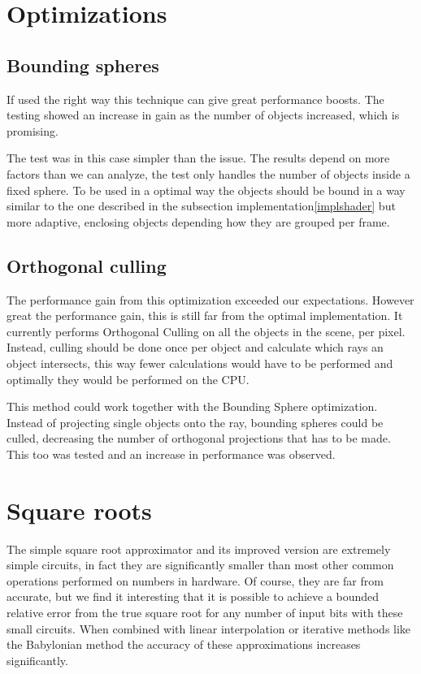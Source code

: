	\section{Optimizations} \label{optimization}

		\subsection{Bounding spheres}

			If used the right way this technique can give great performance 
			boosts. The testing showed an increase in gain as the number of 
			objects increased, which is promising.

			The test was in this case simpler than the issue. The results depend
			on more factors than we can analyze, the test only handles the 
			number of objects inside a fixed sphere. To be used in a optimal way
			the objects should be bound in a way similar to the one described in
			the subsection implementation\ref{implshader} but more adaptive, 
			enclosing objects depending how they are grouped per frame. 

		\subsection{Orthogonal culling}

			The performance gain from this optimization exceeded our 
			expectations. However great the performance gain, this
			is still far from the optimal implementation. It currently performs 
			Orthogonal Culling on all the objects in the scene, per pixel. 
			Instead, culling should be done once per object and calculate 
			which rays an object intersects, this way fewer calculations would
			have to be performed and optimally they would be performed on the
			CPU.

			This method could work together with the Bounding Sphere
			optimization. Instead of projecting single objects onto the ray,
			bounding spheres could be culled, decreasing the number of
			orthogonal projections that has to be made. This too was tested and
			an increase in performance was observed.

	\section{Square roots}

		The simple square root approximator and its improved version are
		extremely simple circuits, in fact they are significantly smaller than
		most other common operations performed on numbers in hardware. Of
		course, they are far from accurate, but we find it interesting that it
		is possible to achieve a bounded relative error from the true square
		root for any number of input bits with these small circuits. When
		combined with linear interpolation or iterative methods like the
		Babylonian method the accuracy of these approximations increases
		significantly.
		
